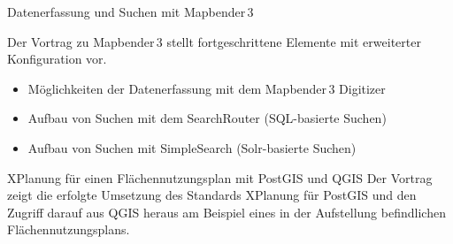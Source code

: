 %
{Datenerfassung und Suchen mit Mapbender\,3}%
{}%
{Der Vortrag zu Mapbender\,3 stellt fortgeschrittene Elemente mit erweiterter Konfiguration vor. 
\begin{itemize}
\RaggedRight
\setlength{\itemsep}{-2pt} %
 \item Möglichkeiten der Datenerfassung mit dem Mapbender\,3 Digitizer
 \item Aufbau von Suchen mit dem SearchRouter (SQL-basierte Suchen)
 \item Aufbau von Suchen mit SimpleSearch (Solr-basierte Suchen)
\end{itemize}
\justifying%
}

%
{XPlanung für einen Flächennutzungsplan mit PostGIS und QGIS}%
{}%
{Der Vortrag zeigt die erfolgte Umsetzung des Standards XPlanung für PostGIS und den Zugriff darauf aus
QGIS heraus am Beispiel eines in der Aufstellung befindlichen Flächennutzungsplans. }


